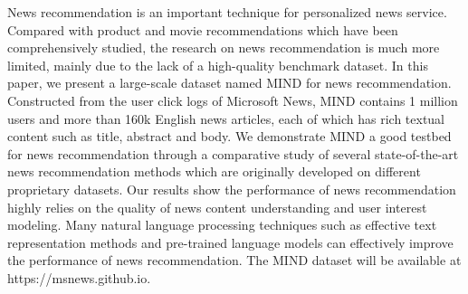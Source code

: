 News recommendation is an important technique for personalized news service. Compared with product and movie recommendations which have been comprehensively studied, the research on news recommendation is much more limited, mainly due to the lack of a high-quality benchmark dataset. In this paper, we present a large-scale dataset named MIND for news recommendation. Constructed from the user click logs of Microsoft News, MIND contains 1 million users and more than 160k English news articles, each of which has rich textual content such as title, abstract and body. We demonstrate MIND a good testbed for news recommendation through a comparative study of several state-of-the-art news recommendation methods which are originally developed on different proprietary datasets. Our results show the performance of news recommendation highly relies on the quality of news content understanding and user interest modeling. Many natural language processing techniques such as effective text representation methods and pre-trained language models can effectively improve the performance of news recommendation. The MIND dataset will be available at https://msnews.github.io.
